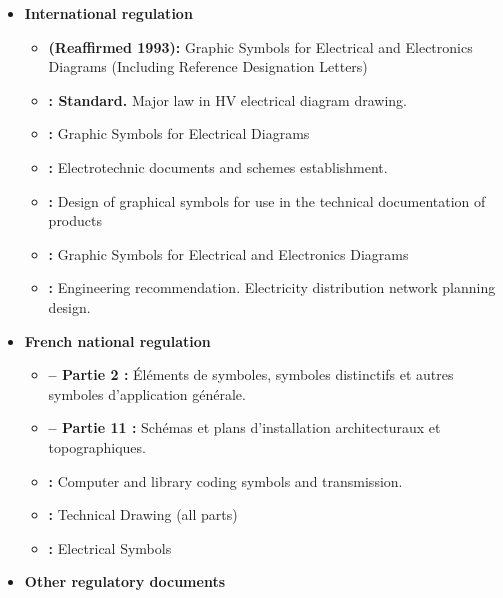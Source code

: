 \begin{itemize}
    \item \textbf{International regulation}
    \begin{itemize}
    \item \textbf{ (Reaffirmed 1993):} Graphic Symbols for Electrical and Electronics Diagrams (Including Reference Designation Letters)
\item \textbf{: Standard.}
        Major law in HV electrical diagram drawing. 
\item \textbf{:} Graphic Symbols for Electrical Diagrams 
\item \textbf{:} Electrotechnic documents and schemes establishment.
\item\textbf{:} 
Design of graphical symbols for use in the technical documentation of products
\item\textbf{:} 
Graphic Symbols for Electrical and Electronics Diagrams
\item \textbf{:} Engineering recommendation. Electricity distribution network planning design.


    \end{itemize}

    \item{\textbf{French national regulation}}
    \begin{itemize} 
\item \textbf{ – Partie 2 :} Éléments de symboles,
symboles distinctifs et autres symboles d’application générale.
\item \textbf{ – Partie 11 :} Schémas et plans
d’installation architecturaux et topographiques.
\item \textbf{:} Computer and library coding symbols and transmission.
\item \textbf{:} Technical Drawing (all parts)
\item \textbf{:} Electrical Symbols
    
 \end{itemize}
\item{\textbf{Other regulatory documents}}
\begin{itemize} 
       

\end{itemize}
\end{itemize}
